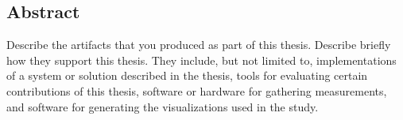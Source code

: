 \subsection{Abstract}

Describe the artifacts that you produced as part of this thesis. Describe
briefly how they support this thesis.
%
They include, but not limited to, implementations of a system or solution
described in the thesis, tools for evaluating certain contributions of this
thesis, software or hardware for gathering measurements, and software for
generating the visualizations used in the study.


